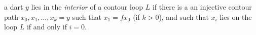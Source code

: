 \begin{definition}\label{def:interior} 
a dart $y$ lies in the {\it interior} of a contour
loop $L$ if there is a an injective contour path
$x_0,x_1,\ldots,x_k=y$ such that $x_1 = f x_0$ (if $k>0$), and
such that $x_i$ lies on the loop $L$ if and only if $i=0$.
\end{definition}

%
%
%
%
%
